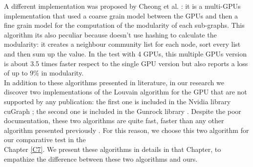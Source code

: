 A different implementation was proposed by Cheong et al. \cite{cheong2013hierarchical}: it is a multi-GPUs implementation that used a coarse grain model between the GPUs and then a fine grain model for the computation of the modularity of each sub-graphs. This algorithm its also peculiar because doesn't use hashing to calculate the modularity: it creates a neighbour community list for each node, sort every list and then sum up the value. In the test with 4 GPUs, this multiple GPUs version is about 3.5 times faster respect to the single GPU version but also reports a loss of up to 9\% in modularity.\\
In addition to these algorithms presented in literature, in our research we discover two implementations of the Louvain algorithm for the GPU that are not supported by any publication: the first one is included in the Nvidia library cuGraph \cite{cuGraph}; the second one is included in the Gunrock library \cite{gunrock}. Despite the poor documentation, these two algorithms are quite fast, faster than any other algorithm presented previously \cite{gunrock_hive}. For this reason, we choose this two algorithm for our comparative test in the \\Chapter \ref{C7}. We present these algorithms in details in that Chapter, to empathize the difference between these two algorithms and ours. 
